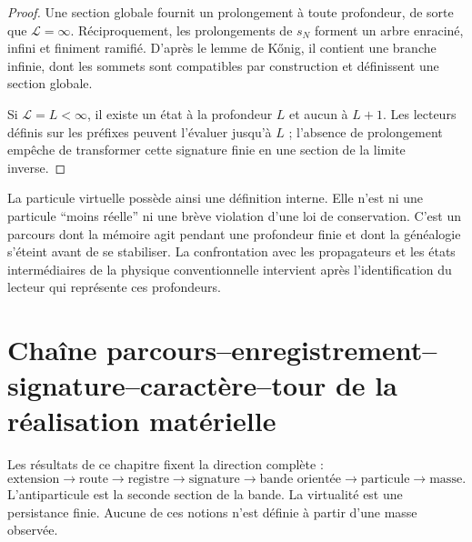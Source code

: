 \begin{proof}
Une section globale fournit un prolongement à toute profondeur, de sorte que \(\mathcal L=\infty\). Réciproquement, les prolongements de \(s_N\) forment un arbre enraciné, infini et finiment ramifié. D’après le lemme de Kőnig, il contient une branche infinie, dont les sommets sont compatibles par construction et définissent une section globale.

Si \(\mathcal L=L<\infty\), il existe un état à la profondeur \(L\) et aucun à \(L+1\). Les lecteurs définis sur les préfixes peuvent l’évaluer jusqu’à \(L\) ; l’absence de prolongement empêche de transformer cette signature finie en une section de la limite inverse.
\end{proof}

La particule virtuelle possède ainsi une définition interne. Elle n’est ni une particule ``moins réelle'' ni une brève violation d’une loi de conservation. C’est un parcours dont la mémoire agit pendant une profondeur finie et dont la généalogie s’éteint avant de se stabiliser. La confrontation avec les propagateurs et les états intermédiaires de la physique conventionnelle intervient après l’identification du lecteur qui représente ces profondeurs.

\section{Chaîne parcours–enregistrement–signature–caractère–tour de la réalisation matérielle}

Les résultats de ce chapitre fixent la direction complète :
\[
\boxed{
\text{extension}\to
\text{route}\to
\text{registre}\to
\text{signature}\to
\text{bande orientée}\to
\text{particule}\to
\text{masse}.}
\]
L’antiparticule est la seconde section de la bande. La virtualité est une persistance finie. Aucune de ces notions n’est définie à partir d’une masse observée.

